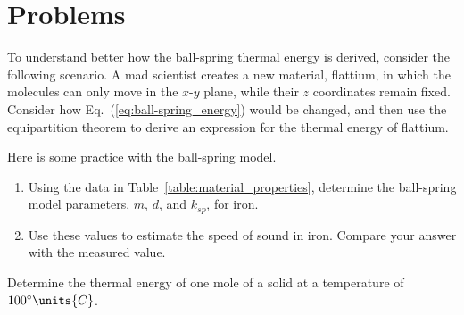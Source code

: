 \newpage

\section*{Problems}

\begin{problem}
  To understand better how the ball-spring thermal energy
  is derived, consider the following scenario.
  A mad scientist creates a new material, flattium, in which the
  molecules can only move in the $x$-$y$ plane, while their $z$
  coordinates remain fixed.  Consider how
  Eq.~(\ref{eq:ball-spring_energy}) would be changed, and then use
  the equipartition theorem to derive an expression for the thermal energy of
  flattium.
\label{problem:flattium}
\end{problem}

\begin{problem}
  Here is some practice with the ball-spring model.
\begin{enumerate}
\item Using the data in Table~\ref{table:material_properties},
  determine the ball-spring model parameters, $m$, $d$, and $k_{sp}$,
  for iron.
\item Use these values to estimate the speed of sound in iron.
  Compare your answer with the measured value.
\end{enumerate}
\label{problem:ball-spring_iron}
\end{problem}

\begin{problem}
  Determine the thermal energy of one mole of a solid at a temperature of
  $100^\circ\units{C}$.
  \label{problem:iron_E_thermal}
\end{problem}




